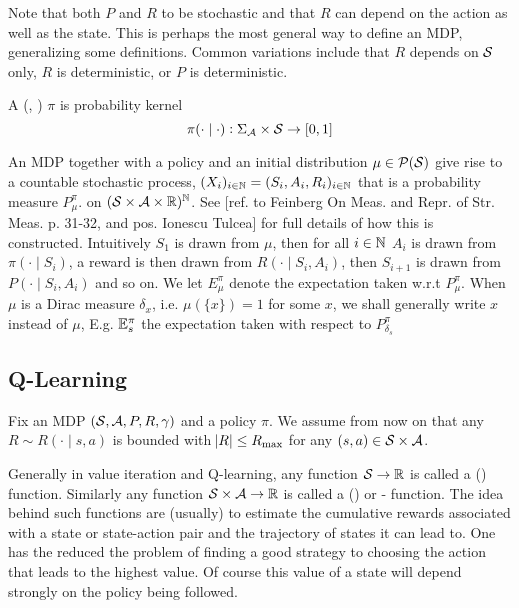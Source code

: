 Note that both $P$ and $R$ to be stochastic
and that $R$ can depend on the action as well as the state.
This is perhaps the most general way to define an MDP,
generalizing some definitions. Common variations include that
$R$ depends on $\mathcal{S}$ only,
$R$ is deterministic, or
$P$ is deterministic. %
\begin{defn}[Policy]
A (, ) 
$\pi$ is probability kernel
\[\pi(\cdot \mid \cdot) : \Sigma_{\mathcal{A}} \times \mathcal{S} \to [0,1] \]
\end{defn}

An MDP together with a policy and an initial distribution
$\mu \in \mathcal{P}(\mathcal{S})$
give rise to a countable stochastic process,
$ (X_i)_{i\in \mathbb{N}} = (S_i, A_i, R_i)_{i\in \mathbb{N}}$ 
that is a probability measure $P^\pi_\mu$. on
$(\mathcal{S} \times \mathcal{A} \times \mathbb{R})^\mathbb{N} $.
See [ref. to Feinberg On Meas. and Repr. of Str. Meas. p. 31-32,
and pos. Ionescu Tulcea] %
for full details of how this is constructed.
Intuitively $S_1$ is drawn from $\mu$,
then for all $i \in \mathbb{N}$
$A_i$ is drawn from $\pi(\cdot \mid S_i)$,
a reward is then drawn from $R(\cdot \mid S_i, A_i)$,
then $S_{i+1}$ is drawn from $P(\cdot \mid S_i, A_i)$ and so on.
We let $E^\pi_\mu$ denote the expectation taken w.r.t $P^\pi_\mu$.
When $\mu$ is a Dirac measure $\delta_x$, i.e. $\mu(\{x\}) = 1$ for some $x$,
we shall generally write $x$ instead of $\mu$,
E.g. $\mathbb{E}^\pi_s$ the expectation taken with respect to $P^\pi_{\delta_s}$

\subsection{Q-Learning}

Fix an MDP $(\mathcal{S}, \mathcal{A}, P, R, \gamma)$ and a policy $\pi$.
We assume from now on that any $R \sim R(\cdot \mid s, a)$ is bounded
with $\abs{R} \leq R_{\max}$ for any $(s,a) \in \mathcal{S} \times \mathcal{A}$.

Generally in value iteration and Q-learning,
any function $\mathcal{S} \to \mathbb{R}$ is called a ()
 function. Similarly any function
$\mathcal{S} \times \mathcal{A} \to \mathbb{R}$ is called a ()
 or - function.
The idea behind such functions are (usually) to estimate the
cumulative rewards associated with a state or state-action pair
and the trajectory of states it can lead to.
One has the reduced the problem of finding a good strategy
to choosing the action that leads to the
highest value. Of course this value of a state will depend
strongly on the policy being followed. 

